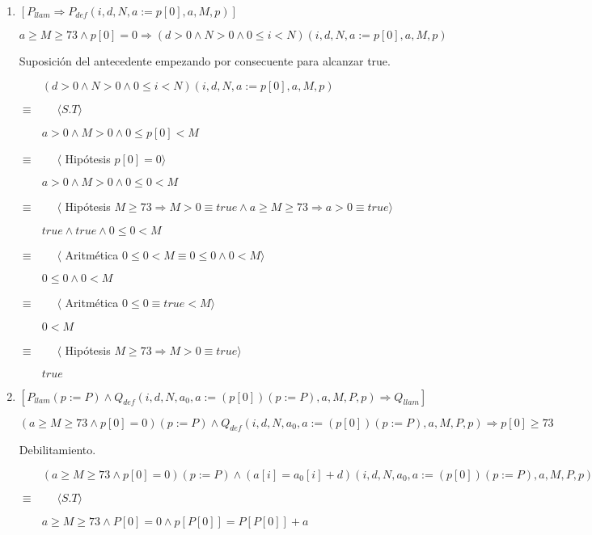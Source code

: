 \documentclass[hidelinks]{article}
\begin{document}
\begin{enumerate}
	\item $[P_{llam} \Rightarrow P_{def}(i,d,N,a := p[0],a,M,p)]$ \par
	      $a \geq M \geq 73 \land p[0]=0 \Rightarrow (d>0 \land N>0 \land 0 \leq i < N)(i,d,N,a := p[0],a,M,p)$ \par
	      Suposición del antecedente empezando por consecuente para alcanzar true. \par
	      $\qquad (d>0 \land N>0 \land 0 \leq i < N)(i,d,N,a := p[0],a,M,p)$ \par
	      $\equiv \qquad \langle S.T \rangle$ \par
	      $\qquad a>0 \land M>0 \land 0 \leq p[0] < M$ \par
	      $\equiv \qquad \langle$ Hipótesis   $p[0]=0\rangle$ \par
	      $\qquad a>0 \land M>0 \land 0 \leq 0 < M$ \par
	      $\equiv \qquad \langle$ Hipótesis   $M \geq 73 \Rightarrow M > 0 \equiv true \land a \geq M \geq 73 \Rightarrow a > 0 \equiv true \rangle$ \par
	      $\qquad true \land true \land 0 \leq 0 < M$ \par
	      $\equiv \qquad \langle$ Aritmética   $0 \leq 0 < M \equiv 0 \leq 0 \land 0 < M \rangle$ \par
	      $\qquad 0 \leq 0 \land 0 < M$ \par
	      $\equiv \qquad \langle$ Aritmética   $0 \leq 0 \equiv true < M \rangle$ \par
	      $\qquad 0 < M$ \par
	      $\equiv \qquad \langle$ Hipótesis   $M \geq 73 \Rightarrow M > 0 \equiv true \rangle$ \par
	      $\qquad true$ \par
	\item $[P_{llam}(p := P) \land Q_{def}(i,d,N,a_0,a := (p[0])(p := P),a, M, P, p) \Rightarrow Q_{llam}]$ \par
	      $(a \geq M \geq 73 \land p[0]=0)(p := P) \land Q_{def}(i,d,N,a_0,a := (p[0])(p := P),a, M, P, p) \Rightarrow p[0] \geq 73$ \par
	      Debilitamiento. \par
	      $\qquad (a \geq M \geq 73 \land p[0]=0)(p := P) \land (a[i] = a_0[i] + d)(i,d,N,a_0,a := (p[0])(p := P),a, M, P, p)$ \par
	      $\equiv \qquad \langle S.T \rangle$ \par
	      $\qquad a \geq M \geq 73 \land P[0]=0 \land p[P[0]] = P[P[0]] + a$ \par

\end{enumerate}
\end{document}
